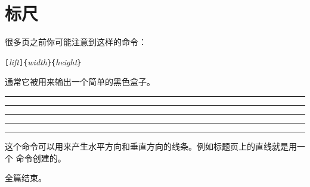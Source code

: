 \section{标尺}
\label{sec:rule}

很多页之前你可能注意到这样的命令：
\begin{lscommand}
\verb|[|\emph{lift}\verb|]{|\emph{width}\verb|}{|\emph{height}\verb|}|
\end{lscommand}

\noindent 通常它被用来输出一个简单的黑色盒子。

\begin{example}
\rule{3mm}{.1pt}%
\rule[-1mm]{5mm}{1cm}%
\rule{3mm}{.1pt}%
\rule[1mm]{1cm}{5mm}%
\rule{3mm}{.1pt}
\end{example}

\noindent 这个命令可以用来产生水平方向和垂直方向的线条。例如标题页上的直线就是用一个  命令创建的。

\bigskip
{\flushright 全篇结束。\par}
%


\endinput